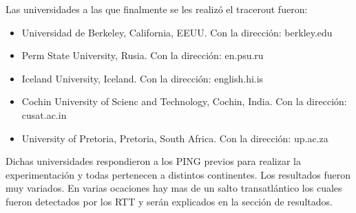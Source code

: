 \begin{itemize}
\end{itemize}

Las universidades a las que finalmente se les realizó el tracerout fueron:

\begin{itemize}
	\item Universidad de Berkeley, California, EEUU. Con la dirección: berkley.edu
	\item Perm State University, Rusia. Con la dirección: en.psu.ru
	\item Iceland University, Iceland. Con la dirección: english.hi.is
	\item Cochin University of Scienc and Technology, Cochin, India. Con la dirección: cusat.ac.in
	\item University of Pretoria, Pretoria, South Africa. Con la dirección: up.ac.za 
\end{itemize}

Dichas universidades respondieron a los PING previos para realizar la experimentación y todas pertenecen a distintos continentes. Los resultados fueron muy variados. En varias ocaciones hay mas de un salto transatlántico los cuales fueron detectados por los RTT y serán explicados en la sección de resultados.